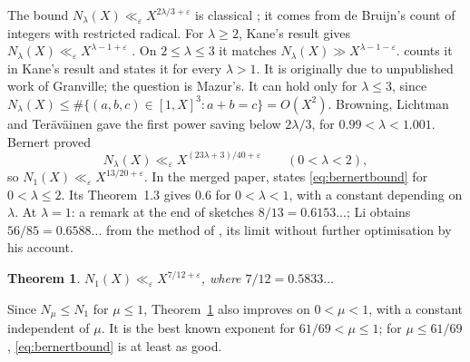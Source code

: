 \documentclass{amsart}
\newtheorem{theorem}{Theorem}
\numberwithin{equation}{section}
\numberwithin{table}{section}
\begin{document}
The bound $N_\lambda(X)\ll_\varepsilon X^{2\lambda/3+\varepsilon}$ is
classical \cite[Proposition~1.1]{BBLT}; it comes from de Bruijn's count
\cite{dB} of integers with restricted radical. For $\lambda\ge2$, Kane's result
\cite{Ka} gives $N_\lambda(X)\ll_\varepsilon X^{\lambda-1+\varepsilon}$
\cite[Section~1]{BBLT}. On $2\le\lambda\le3$ it matches
$N_\lambda(X)\gg X^{\lambda-1-\varepsilon}$. \cite[Section~1]{BBLT} counts it in Kane's result and states it for every
$\lambda>1$. It is originally due to unpublished work of Granville; the
question is Mazur's. It can
hold only for $\lambda\le3$, since
$N_\lambda(X)\le\#\{(a,b,c)\in[1,X]^3:a+b=c\}=O(X^2)$. Browning, Lichtman and
Ter\"av\"ainen \cite[Theorem~1.2]{BLT} gave the first power saving below
$2\lambda/3$, for $0.99<\lambda<1.001$. Bernert \cite[Theorem~1]{Be} proved
\begin{equation}\label{eq:bernertbound}
 N_\lambda(X)\ll_\varepsilon X^{(23\lambda+3)/40+\varepsilon}
 \qquad(0<\lambda<2),
\end{equation}
so $N_1(X)\ll_\varepsilon X^{13/20+\varepsilon}$. In the merged paper,
\cite[Theorem~1.2]{BBLT} states \eqref{eq:bernertbound} for $0<\lambda\le2$.
Its Theorem~1.3 gives $0.6$ for $0<\lambda<1$, with a constant depending on
$\lambda$. At $\lambda=1$: a remark at the end of
\cite[Section~4]{Be} sketches $8/13=0.6153\ldots$; Li \cite{Li} obtains
$56/85=0.6588\ldots$ from the method of \cite{BLT}, its limit without further
optimisation by his account.

\begin{theorem}\label{thm:main}
$N_1(X)\ll_\varepsilon X^{7/12+\varepsilon}$, where $7/12=0.5833\ldots$
\end{theorem}

Since $N_\mu\le N_1$ for $\mu\le1$, Theorem~\ref{thm:main} also improves
\cite[Theorem~1.3]{BBLT} on $0<\mu<1$, with a constant independent of $\mu$.
It is the best known exponent for $61/69<\mu\le1$; for $\mu\le61/69$,
\eqref{eq:bernertbound} is at least as good.
\end{document}

